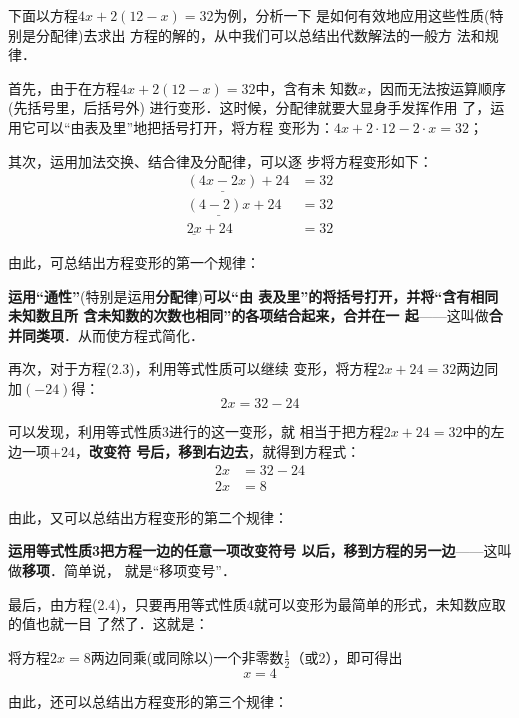 下面以方程$4x+2(12-x) =32$为例，分析一下
是如何有效地应用这些性质(特别是分配律)去求出
方程的解的，从中我们可以总结出代数解法的一般方
法和规律．

首先，由于在方程$4x+2(12-x)= 32$中，含有未
知数$x$，因而无法按运算顺序(先括号里，后括号外)
进行变形．这时候，分配律就要大显身手发挥作用
了，运用它可以“由表及里”地把括号打开，将方程
变形为：$4x+2\cdot 12-2 \cdot  x = 32$；

其次，运用加法交换、结合律及分配律，可以逐
步将方程变形如下：
\begin{equation}
    \begin{split}
        \underline{(4x-2x)}+24&=32\\
        \underline{(4-2)x}+24&=32\\
        \underline{2x}+24&=32
    \end{split}
\end{equation}

由此，可总结出方程变形的第一个规律：

\textbf{运用“通性”}(特别是运用\textbf{分配律})\textbf{可以“由
表及里”的将括号打开，并将“含有相同未知数且所
含未知数的次数也相同”的各项结合起来，合并在一
起}——这叫做\textbf{合并同类项}．从而使方程式简化．

再次，对于方程(2.3)，利用等式性质可以继续
变形，将方程$2x+24 = 32$两边同加$(-24)$得：
\[2x = 32 -24\]

可以发现，利用等式性质3进行的这一变形，就
相当于把方程$2x+24 = 32$中的左边一项$+24$，\textbf{改变符
号后，移到右边去}，就得到方程式：
\begin{equation}
    \begin{split}
        2x &= 32 -24\\
        2x&=8
    \end{split}
\end{equation}

由此，又可以总结出方程变形的第二个规律：

\textbf{运用等式性质3把方程一边的任意一项改变符号
以后，移到方程的另一边}——这叫做\textbf{移项}．简单说，
就是“移项变号”．

最后，由方程(2.4)，只要再用等式性质4就可以变形为最简单的形式，未知数应取的值也就一目
了然了．这就是：

将方程$2x = 8$两边同乘(或同除以)一个非零数$\frac{1}{2}$（或2），即可得出
\begin{equation}
    x=4
\end{equation}

由此，还可以总结出方程变形的第三个规律：

